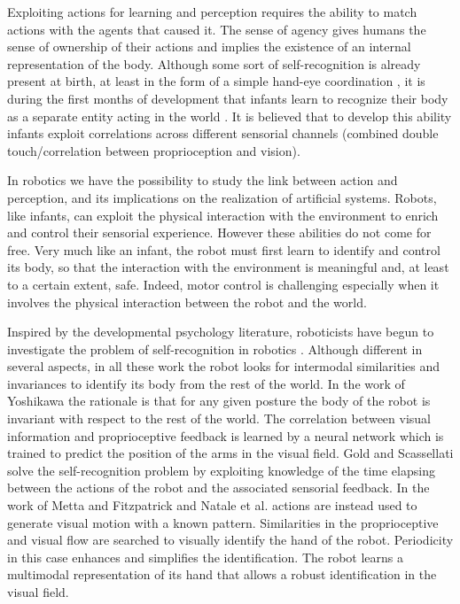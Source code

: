 Exploiting actions for learning and perception requires the ability to
match actions with the agents that caused it. The sense of agency
\cite{jeannerod02mechanism} gives humans the sense of ownership of
their actions and implies the existence of an internal representation
of the body. Although some sort of self-recognition is already present
at birth, at least in the form of a simple hand-eye coordination
\cite{meer95thefunctional}, it is during the first months of
development that infants learn to recognize their body as a separate
entity acting in the world \cite{rochat00perceived}. It is believed
that to develop this ability infants exploit correlations across
different sensorial channels (combined double touch/correlation
between proprioception and vision).



In robotics we have the possibility to study the link between action
and perception, and its implications on the realization of artificial
systems. Robots, like infants, can exploit the physical interaction with
the environment to enrich and control their sensorial
experience. However these abilities do not come for free. Very much
like an infant, the robot must first learn to identify and control its
body, so that the interaction with the environment is meaningful and,
at least to a certain extent, safe. Indeed, motor control is
challenging especially when it involves the physical interaction
between the robot and the world.

Inspired by the developmental psychology literature, roboticists have
begun to investigate the problem of self-recognition in robotics
\cite{yoshikawa03doestheinvariance,metta03early,natale05exploring,gold05learning}. Although
different in several aspects, in all these work the robot looks for
intermodal similarities and invariances to identify its body from the
rest of the world.  In the work of Yoshikawa
\cite{yoshikawa03doestheinvariance} the rationale is that for any
given posture the body of the robot is invariant with respect to the
rest of the world. The correlation between visual information and
proprioceptive feedback is learned by a neural network which is trained
to predict the position of the arms in the visual field.  Gold and
Scassellati \cite{gold05learning} solve the self-recognition problem
by exploiting knowledge of the time elapsing between the actions of
the robot and the associated sensorial feedback.  In the work of Metta
and Fitzpatrick \cite{metta03early} and Natale et
al. \cite{natale05exploring} actions are instead used to generate
visual motion with a known pattern. Similarities in the proprioceptive
and visual flow are searched to visually identify the hand of the
robot. Periodicity in this case enhances and simplifies the
identification. The robot learns a multimodal representation of its
hand that allows a robust identification in the visual field.


